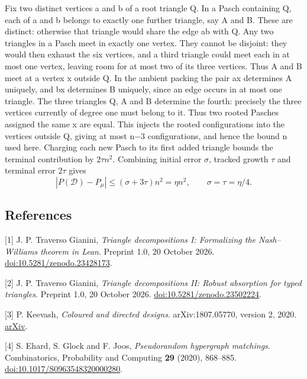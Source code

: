 \documentclass[english,11pt,a4paper]{article}
\begin{document}
Fix two distinct vertices a and b of a root triangle Q. In a Pasch containing Q, each of a and b belongs to exactly one further triangle, say A and B. These are distinct: otherwise that triangle would share the edge ab with Q. Any two triangles in a Pasch meet in exactly one vertex. They cannot be disjoint: they would then exhaust the six vertices, and a third triangle could meet each in at most one vertex, leaving room for at most two of its three vertices. Thus A and B meet at a vertex x outside Q. In the ambient packing the pair ax determines A uniquely, and bx determines B uniquely, since an edge occurs in at most one triangle. The three triangles Q, A and B determine the fourth: precisely the three vertices currently of degree one must belong to it. Thus two rooted Pasches assigned the same x are equal. This injects the rooted configurations into the vertices outside Q, giving at most n−3 configurations, and hence the bound n used here. Charging each new Pasch to its first added triangle bounds the terminal contribution by \(2\tau n^2\). Combining initial error \(\sigma\), tracked growth \(\tau\) and terminal error \(2\tau\) gives
\[|P(\mathcal D)-P_\mu|\leq(\sigma+3\tau)n^2=\eta n^2,\qquad \sigma=\tau=\eta/4.\tag{D.10}\]


\clearpage
\subsection{References}\label{references}

\begingroup\small\raggedright\setlength{\parskip}{3pt}

{[}1{]} J. P. Traverso Gianini, \emph{Triangle decompositions I: Formalizing the Nash--Williams theorem in Lean}. Preprint 1.0, 20 October 2026. \href{https://doi.org/10.5281/zenodo.23428173}{doi:10.5281/zenodo.23428173}.

{[}2{]} J. P. Traverso Gianini, \emph{Triangle decompositions II: Robust absorption for typed triangles}. Preprint 1.0, 20 October 2026. \href{https://doi.org/10.5281/zenodo.23502224}{doi:10.5281/zenodo.23502224}.

{[}3{]} P. Keevash, \emph{Coloured and directed designs}. arXiv:1807.05770, version 2, 2020. \href{https://arxiv.org/abs/1807.05770v2}{arXiv}.

{[}4{]} S. Ehard, S. Glock and F. Joos, \emph{Pseudorandom hypergraph matchings}. Combinatorics, Probability and Computing \textbf{29} (2020), 868--885. \href{https://doi.org/10.1017/S0963548320000280}{doi:10.1017/S0963548320000280}.
\end{document}
